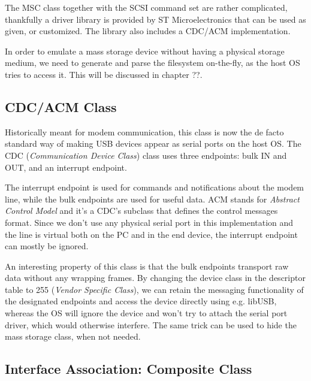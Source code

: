 


The MSC class together with the SCSI command set are rather complicated, thankfully a driver library is provided by ST Microelectronics that can be used as given, or customized. The library also includes a CDC/ACM implementation.

In order to emulate a mass storage device without having a physical storage medium, we need to generate and parse the filesystem on-the-fly, as the host OS tries to access it. This will be discussed in chapter ??.

\subsection{CDC/ACM Class}


Historically meant for modem communication, this class is now the de facto standard way of making USB devices appear as serial ports on the host OS. The CDC (\textit{Communication Device Class}) class uses three endpoints: bulk IN and OUT, and an interrupt endpoint. 

The interrupt endpoint is used for commands and notifications about the modem line, while the bulk endpoints are used for useful data. ACM stands for \textit{Abstract Control Model} and it's a CDC's subclass that defines the control messages format. Since we don't use any physical serial port in this implementation and the line is virtual both on the PC and in the end device, the interrupt endpoint can mostly be ignored.

An interesting property of this class is that the bulk endpoints transport raw data without any wrapping frames. By changing the device class in the descriptor table to 255 (\textit{Vendor Specific Class}), we can retain the messaging functionality of the designated endpoints and access the device directly using e.g. libUSB, whereas the OS will ignore the device and won't try to attach the serial port driver, which would otherwise interfere. The same trick can be used to hide the mass storage class, when not needed.

\subsection{Interface Association: Composite Class}


